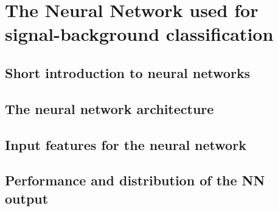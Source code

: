 \chapter{The Neural Network used for signal-background classification}
\section{Short introduction to neural networks}
\section{The neural network architecture}
\section{Input features for the neural network}
\section{Performance and distribution of the NN output}